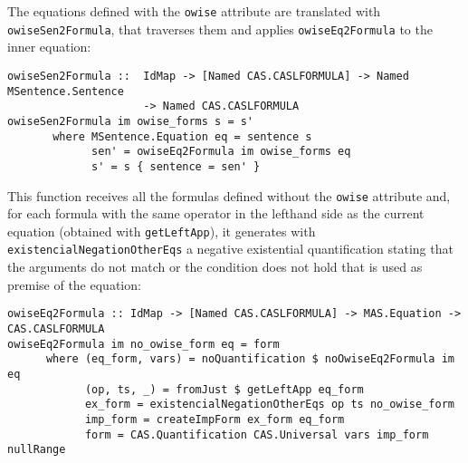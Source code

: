 The equations defined with the \verb"owise" attribute are translated
with \verb"owiseSen2Formula", that traverses them and applies
\verb"owiseEq2Formula" to the inner equation:

{\codesize
\begin{verbatim}
owiseSen2Formula ::  IdMap -> [Named CAS.CASLFORMULA] -> Named MSentence.Sentence 
                     -> Named CAS.CASLFORMULA
owiseSen2Formula im owise_forms s = s'
       where MSentence.Equation eq = sentence s
             sen' = owiseEq2Formula im owise_forms eq
             s' = s { sentence = sen' }
\end{verbatim}
}

This function receives all the formulas defined without the \verb"owise"
attribute and, for each formula with the same operator in the lefthand
side as the current equation (obtained with \verb"getLeftApp"), it
generates with \verb"existencialNegationOtherEqs" a negative existential
quantification stating that the arguments do not match or the condition
does not hold that is used as premise of the equation:

{\codesize
\begin{verbatim}
owiseEq2Formula :: IdMap -> [Named CAS.CASLFORMULA] -> MAS.Equation -> CAS.CASLFORMULA
owiseEq2Formula im no_owise_form eq = form
      where (eq_form, vars) = noQuantification $ noOwiseEq2Formula im eq
            (op, ts, _) = fromJust $ getLeftApp eq_form
            ex_form = existencialNegationOtherEqs op ts no_owise_form
            imp_form = createImpForm ex_form eq_form
            form = CAS.Quantification CAS.Universal vars imp_form nullRange
\end{verbatim}
}



